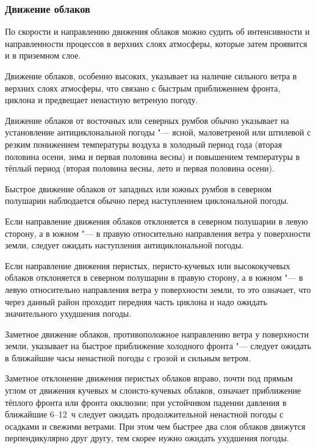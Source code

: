 \subsubsection{Движение облаков}

По скорости и направлению движения облаков можно судить об
интенсивности и направленности процессов в верхних слоях атмосферы,
которые затем проявится и в приземном слое.

 Движение облаков, особенно высоких, указывает на наличие
сильного ветра в верхних слоях атмосферы, что связано с быстрым
приближением фронта, циклона и предвещает ненастную ветреную погоду.

 Движение облаков от восточных или северных румбов обычно
указывает на установление антициклональной погоды "--- ясной,
маловетреной или штилевой с резким понижением температуры воздуха в
холодный период года (вторая половина осени, зима и первая половина
весны) и повышением температуры в тёплый период (вторая половина
весны, лето и первая половина осени).

 Быстрое движение облаков от западных или южных румбов в
северном полушарии наблюдается обычно перед наступлением циклональной
погоды.

 Если направление движения облаков отклоняется в северном
полушарии в левую сторону, а в южном "--- в правую относительно направления
ветра у поверхности земли, следует ожидать наступления
антициклональной погоды.

 Если направление движения перистых, перисто-кучевых или
высококучевых облаков отклоняется в северном полушарии в правую
сторону, а в южном "--- в левую относительно направления ветра у
поверхности земли, то это означает, что через данный район проходит
передняя часть циклона и надо ожидать значительного ухудшения погоды.

 Заметное движение облаков, противоположное направлению ветра у
поверхности земли, указывает на быстрое приближение холодного
фронта "--- следует ожидать в ближайшие часы ненастной погоды с грозой и
сильным ветром.

 Заметное отклонение движения перистых облаков вправо, почти под
прямым углом от движения кучевых м слоисто-кучевых облаков, означает
приближение тёплого фронта или фронта окклюзии; при устойчивом падении
давления в ближайшие 6--12~ч следует ожидать продолжительной ненастной
погоды с осадками и свежими ветрами. При этом чем быстрее два слоя
облаков движутся перпендикулярно друг другу, тем скорее нужно ожидать
ухудшения погоды.

